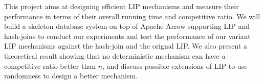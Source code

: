 This project aims at designing efficient LIP mechanisms and measure their performance in terms of their overall running time and competitive ratio. We will build a skeleton database system on top of Apache Arrow supporting LIP and hash-joins to conduct our experiments and test the performance of our variant LIP mechanisms against the hash-join and the orignal LIP. We also present a theoretical result showing that no deterministic mechanism can have a competitive ratio better than $n$, and discuss possible extensions of LIP to use randomness to design a better mechanism.




